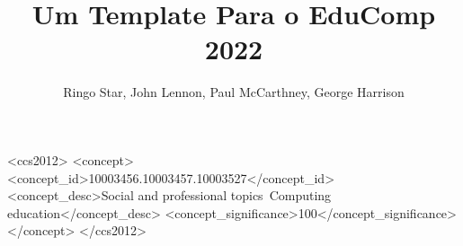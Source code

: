 \documentclass[sigconf, review, anonymous]{educomp}
\begin{document}
\title[Título curto, caso necessário]{Um Template Para o EduComp 2022}


\author{Ringo Star, John Lennon, Paul McCarthney, George Harrison}

\renewcommand{\shortauthors}{-}

\newcommand{\showDOI}[1]{\unskip}


\begin{abstract}



\end{abstract}

\begin{CCSXML}
<ccs2012>
<concept>
<concept_id>10003456.10003457.10003527</concept_id>
<concept_desc>Social and professional topics~Computing education</concept_desc>
<concept_significance>100</concept_significance>
</concept>
</ccs2012>
\end{CCSXML}



\maketitle















\end{document}
